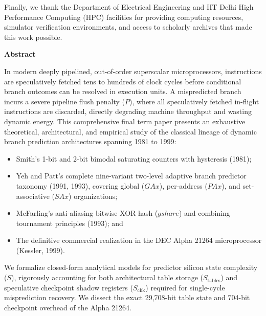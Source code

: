 \documentclass[11pt,a4paper]{article}
\begin{document}
\vspace{0.8em}
\noindent
Finally, we thank the Department of Electrical Engineering and IIT Delhi High Performance Computing (HPC) facilities for providing computing resources, simulator verification environments, and access to scholarly archives that made this work possible.

\clearpage

\begin{center}
    {\Large \textbf{Abstract}}
\end{center}
\vspace{0.5em}

\noindent
In modern deeply pipelined, out-of-order superscalar microprocessors, instructions are speculatively fetched tens to hundreds of clock cycles before conditional branch outcomes can be resolved in execution units. A mispredicted branch incurs a severe pipeline flush penalty ($P$), where all speculatively fetched in-flight instructions are discarded, directly degrading machine throughput and wasting dynamic energy. This comprehensive final term paper presents an exhaustive theoretical, architectural, and empirical study of the classical lineage of dynamic branch prediction architectures spanning 1981 to 1999:
\begin{itemize}[leftmargin=1.5em, itemsep=0.2em]
    \item Smith's 1-bit and 2-bit bimodal saturating counters with hysteresis (1981);
    \item Yeh and Patt's complete nine-variant two-level adaptive branch predictor taxonomy (1991, 1993), covering global ($GAx$), per-address ($PAx$), and set-associative ($SAx$) organizations;
    \item McFarling's anti-aliasing bitwise XOR hash ($gshare$) and combining tournament principles (1993); and
    \item The definitive commercial realization in the DEC Alpha 21264 microprocessor (Kessler, 1999).
\end{itemize}

\vspace{0.6em}
\noindent
We formalize closed-form analytical models for predictor silicon state complexity ($S$), rigorously accounting for both architectural table storage ($S_{\text{tables}}$) and speculative checkpoint shadow registers ($S_{\text{chk}}$) required for single-cycle misprediction recovery. We dissect the exact 29,708-bit table state and 704-bit checkpoint overhead of the Alpha 21264. 
\end{document}
